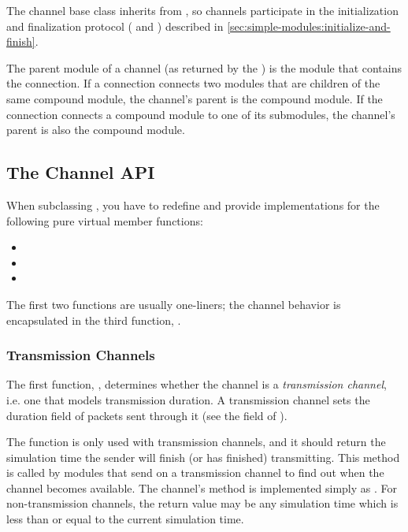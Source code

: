 The channel base class  inherits from ,
so channels participate in the initialization and finalization protocol
( and ) described in
\ref{sec:simple-modules:initialize-and-finish}.

The parent module of a channel (as returned by the
) is the module that contains
the connection. If a connection connects two modules that are children of
the same compound module, the channel's parent is the compound module. If
the connection connects a compound module to one of its submodules, the
channel's parent is also the compound module.


\subsection{The Channel API}

When subclassing , you have to redefine and provide
implementations for the following pure virtual member functions:

\begin{itemize}
  \item {}
  \item {}
  \item {}
\end{itemize}

The first two functions are usually one-liners; the channel behavior is
encapsulated in the third function, .

\subsubsection{Transmission Channels}

The first function, , determines whether
the channel is a \textit{transmission channel}, i.e. one that models
transmission duration. A transmission channel sets the duration field of
packets sent through it (see the  field of
).

The  function is only used with
transmission channels, and it should return the simulation time the sender
will finish (or has finished) transmitting. This method is called by
modules that send on a transmission channel to find out when the channel
becomes available. The channel's  method is implemented
simply as . For
non-transmission channels, the  return
value may be any simulation time which is less than or equal to the current
simulation time.

